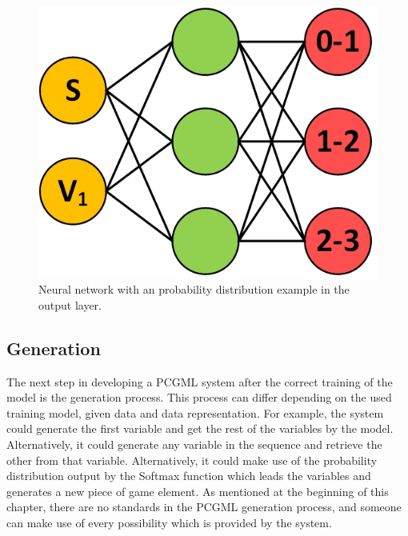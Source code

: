 \documentclass[MGS,Master,english]{twbook}%
\begin{document}
\begin{figure}[!htbp]
	\centering
	\includegraphics[width=0.3\linewidth]{PICs/NNs/PCGML_development_example_NN_categorical_distributions}
	\caption{Neural network with an probability distribution example in the output layer.}\label{fig::PCGML::devExample::NNwithSoftmax}
\end{figure}


\subsection{Generation}
The next step in developing a PCGML system after the correct training of the model is the generation process. This process can differ depending on the used training model, given data and data representation. For example, the system could generate the first variable and get the rest of the variables by the model. Alternatively, it could generate any variable in the sequence and retrieve the other from that variable. Alternatively, it could make use of the probability distribution output by the Softmax function which leads the variables and generates a new piece of game element. As mentioned at the beginning of this chapter, there are no standards in the PCGML generation process, and someone can make use of every possibility which is provided by the system.
 
%
%
\clearpage
\end{document}
